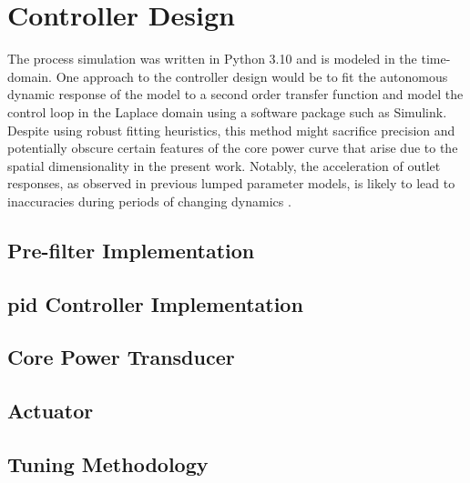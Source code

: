 \chapter{Controller Design}
\label{Chapter:Design}

The process simulation was written in Python 3.10 and is modeled in the time-domain. One approach to the controller design would be to fit the autonomous dynamic response of the model to a second order transfer function and model the control loop in the Laplace domain using a software package such as Simulink. Despite using robust fitting heuristics, this method might sacrifice precision and potentially obscure certain features of the core power curve that arise due to the spatial dimensionality in the present work.  Notably, the acceleration of outlet responses, as observed in previous lumped parameter models, is likely to lead to inaccuracies during periods of changing dynamics \cite{msreSimulink}.

\section{Pre-filter Implementation}


\section{\texorpdfstring{\acs{pid}}{PID} Controller Implementation}

\section{Core Power Transducer}

\section{Actuator}

\section{Tuning Methodology}

